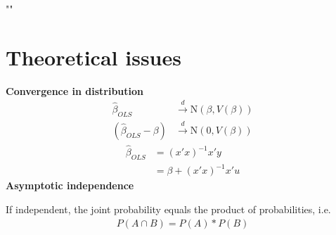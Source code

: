 \epigraph{""}
{\textit{}}

\section{Theoretical issues}
\begin{multicols}{2}
\noindent
\textbf{Convergence in distribution}
\begin{align*}
  \hat{\beta}_{OLS}         &\xrightarrow{d} \textrm{N}(\beta,V(\beta)) \\
  (\hat{\beta}_{OLS}-\beta) &\xrightarrow{d} \textrm{N}(0,V(\beta))
\end{align*}
\begin{align*}
  \hat{\beta}_{OLS} &= (x'x)^{-1}x'y \\
  &= \beta + (x'x)^{-1}x'u
\end{align*}\noindent
\textbf{Asymptotic independence}\par
If independent, the joint probability equals the product of probabilities, i.e.
\begin{align*}
  P(A\cap B) = P(A)*P(B)
\end{align*}
\end{multicols}


